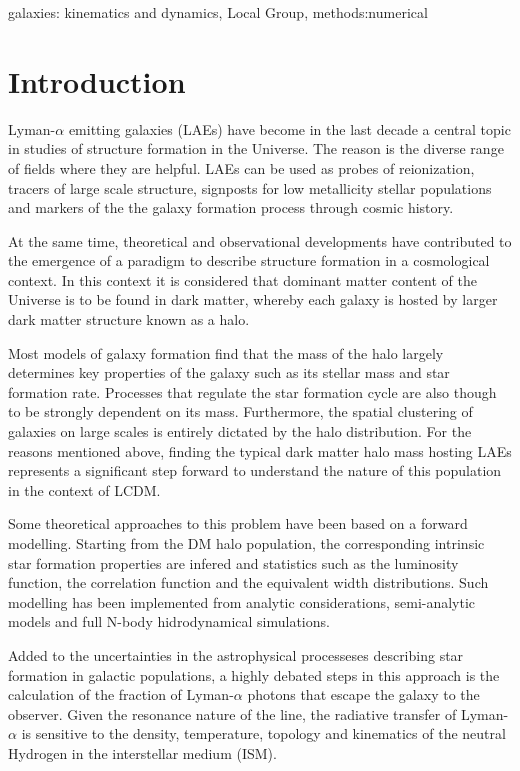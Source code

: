 \documentclass[usenatbib]{mn2e}
\begin{document}
\begin{keywords}
{galaxies: kinematics and dynamics, Local Group, methods:numerical}
\end{keywords}


\section{Introduction}

Lyman-$\alpha$ emitting galaxies (LAEs) have become in the last decade a 
central topic in studies of structure formation in the Universe. The
reason is the diverse range of fields where they are helpful. LAEs can
be used as probes of reionization, tracers of large scale structure,
signposts for low metallicity stellar populations and markers of the
the galaxy formation process through cosmic history.  


At the same time, theoretical and observational developments have
contributed to the emergence of a paradigm to describe structure
formation in a cosmological context. In this context it is considered
that dominant matter content of the Universe is to be found in dark
matter, whereby each galaxy is hosted by larger dark matter structure
known as a halo. 

Most models of galaxy formation find that the mass of the halo largely
determines key properties of the galaxy such as its stellar mass and
star formation rate. Processes that regulate the star formation cycle
are also though to be strongly dependent on its mass. Furthermore, the
spatial clustering of galaxies on large scales is entirely dictated by
the halo distribution.  For the reasons mentioned above, finding the
typical dark matter halo mass hosting LAEs represents a significant
step forward to understand the nature of this population in the
context of LCDM.  

Some theoretical approaches to this problem have been based on a
forward modelling. Starting from the DM halo population, the
corresponding intrinsic star formation properties are infered and
statistics such as the luminosity function, the correlation function
and the equivalent width distributions. Such modelling has been
implemented from analytic considerations, semi-analytic models and
full N-body hidrodynamical simulations. 

Added to the uncertainties in the astrophysical processeses describing
star formation in galactic populations, a highly debated steps in this
approach is the calculation of the fraction of Lyman-$\alpha$ photons
that escape the galaxy to the observer. Given the resonance nature of
the line, the radiative transfer of Lyman-$\alpha$ is sensitive to the
density, temperature, topology and kinematics of the neutral Hydrogen
in the interstellar medium (ISM).  
\end{document}
